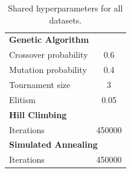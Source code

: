 \begin{table}[h]
\centering\footnotesize\sf

\begin{tabular}{l@{}c}
\multicolumn{2}{l}{\textbf{Genetic Algorithm}} \\
Crossover probability & 0.6 \\
Mutation probability & 0.4 \\
Tournament size & 3 \\
Elitism & 0.05 \\
\midrule
\multicolumn{2}{l}{\textbf{Hill Climbing}} \\
Iterations & 450000 \\
\midrule
\multicolumn{2}{l}{\textbf{Simulated Annealing}} \\
Iterations & 450000 \\
\end{tabular}

\caption[Shared hyperparameters]{Shared hyperparameters for all datasets.}
\label{tab:hyperparams_shared}
\end{table}

